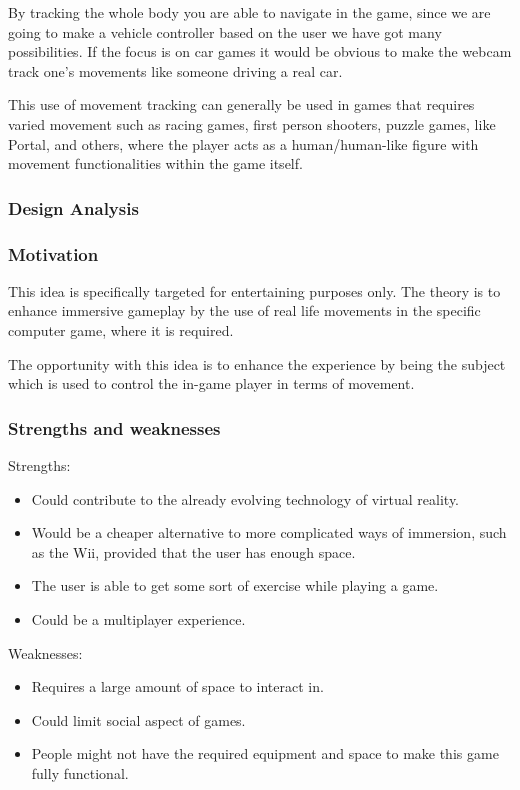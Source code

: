By tracking the whole body you are able to navigate in the game, since we are going to make a vehicle controller based on the user we have got many possibilities. If the focus is on car games it would be obvious to make the webcam track one's movements like someone driving a real car.


This use of movement tracking can generally be used in games that requires varied movement such as racing games, first person shooters, puzzle games, like Portal, and others, where the player acts as a human/human-like figure with movement functionalities within the game itself.

\subsubsection*{Design Analysis}
\subsubsection*{Motivation}
This idea is specifically targeted for entertaining purposes only. The theory is to enhance immersive gameplay by the use of real life movements in the specific computer game, where it is required.


The opportunity with this idea is to enhance the experience by being the subject which is used to control the in-game player in terms of movement.


\subsubsection*{Strengths and weaknesses}
Strengths:
\begin{itemize}
\item Could contribute to the already evolving technology of virtual reality.
\item Would be a cheaper alternative to more complicated ways of immersion, such as the Wii, provided that the user has enough space.
\item The user is able to get some sort of exercise while playing a game.
\item Could be a multiplayer experience.
\end{itemize}
Weaknesses:
\begin{itemize}
\item Requires a large amount of space to interact in.
\item Could limit social aspect of games.
\item People might not have the required equipment and space to make this game fully functional.
\end{itemize}


